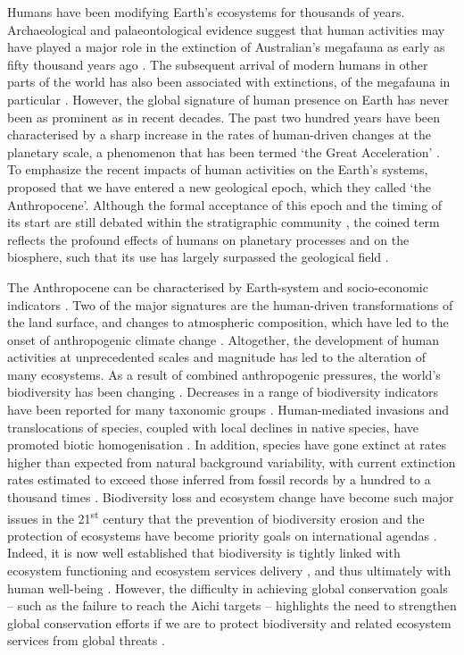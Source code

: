 Humans have been modifying Earth’s ecosystems for thousands of years. Archaeological and palaeontological evidence suggest that human activities may have played a major role in the extinction of Australian’s megafauna as early as fifty thousand years ago \citep{Johnson2016, Miller2016, VanDerKaars2017}. 
The subsequent arrival of modern humans in other parts of the world has also been associated with extinctions, of the megafauna in particular \citep{Sandom2014, Broughton2018}. However, the global signature of human presence on Earth has never been as prominent as in recent decades. The past two hundred years have been characterised by a sharp increase in the rates of human-driven changes at the planetary scale, a phenomenon that has been termed `the Great Acceleration' \citep{Steffen2015}. To emphasize the recent impacts of human activities on the Earth’s systems, \citet{Crutzen2000} proposed that we have entered a new geological epoch, which they called `the Anthropocene'. Although the formal acceptance of this epoch and the timing of its start are still debated within the stratigraphic community \citep{Lewis2015, Monastersky2015}, the coined term reflects the profound effects of humans on planetary processes and on the biosphere, such that its use has largely surpassed the geological field \citep{Malhi2017}. 

The Anthropocene can be characterised by Earth-system and socio-economic indicators \citep{Steffen2011, Biermann2016}. Two of the major signatures are the human-driven transformations of the land surface, and changes to atmospheric composition, which have led to the onset of anthropogenic climate change \citep{Lewis2015}. Altogether, the development of human activities at unprecedented scales and magnitude has led to the alteration of many ecosystems. As a result of combined anthropogenic pressures, the world’s biodiversity has been changing \citep{Dirzo2014, McGill2015, Johnson2017, Daru2021}. 
Decreases in a range of biodiversity indicators have been reported for many taxonomic groups \citep{Butchart2010}. Human-mediated invasions and translocations of species, coupled with local declines in native species, have promoted biotic homogenisation \citep{Newbold2018a, Daru2021, FinderupNielsen2019}.
In addition, species have gone extinct at rates higher than expected from natural background variability, with current extinction rates estimated to exceed those inferred from fossil records by a hundred to a thousand times \citep{Barnosky2011,DeVos2015}. Biodiversity loss and ecosystem change have become such major issues in the 21\textsuperscript{st} century that the prevention of biodiversity erosion and the protection of ecosystems have become priority goals on international agendas \citep{Hoban2020, CBD2020}. Indeed, it is now well established that biodiversity is tightly linked with ecosystem functioning and ecosystem services delivery \citep{Oliver2015, Hooper2005, MA2005}, and thus ultimately with human well-being \citep{MA2005}. However, the difficulty in achieving global conservation goals – such as the failure to reach the Aichi targets \citep{Buchanan2020} – highlights the need to strengthen global conservation efforts if we are to protect biodiversity and related ecosystem services from global threats \citep{Butchart2016}. 

